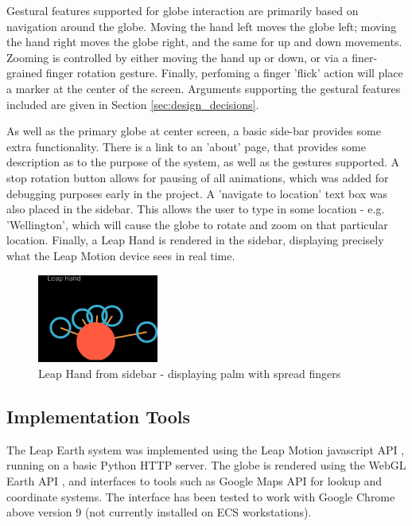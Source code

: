 \documentclass{sigplanconf}
\begin{document}
Gestural features supported for globe interaction are primarily based on navigation around the globe. Moving the hand left moves the globe left; moving the hand right moves the globe right, and the same for up and down movements. Zooming is controlled by either moving the hand up or down, or via a finer-grained finger rotation gesture. Finally, perfoming a finger 'flick' action will place a marker at the center of the screen. Arguments supporting the gestural features included are given in Section \ref{sec:design_decisions}.

As well as the primary globe at center screen, a basic side-bar provides some extra functionality. There is a link to an 'about' page, that provides some description as to the purpose of the system, as well as the gestures supported. A stop rotation button allows for pausing of all animations, which was added for debugging purposes early in the project. A 'navigate to location' text box was also placed in the sidebar. This allows the user to type in some location - e.g. 'Wellington', which will cause the globe to rotate and zoom on that particular location. Finally, a Leap Hand is rendered in the sidebar, displaying precisely what the Leap Motion device sees in real time. 

\begin{center}
\begin{figure}[h!]
\centering
\includegraphics[width=150px]{images/palm_spread_zoom.png}
\caption{Leap Hand from sidebar - displaying palm with spread fingers}
\label{fig:halo_comparison}
\vspace{-10pt}
\end{figure}
\end{center}

\subsection{Implementation Tools}

The Leap Earth system was implemented using the Leap Motion javascript API \cite{leap_js}, running on a basic Python HTTP server. The globe is rendered using the WebGL Earth API \cite{web_gl_api}, and interfaces to tools such as Google Maps API \cite{google_map_js_api} for lookup and coordinate systems. The interface has been tested to work with Google Chrome above version 9 (not currently installed on ECS workstations).
\end{document}
